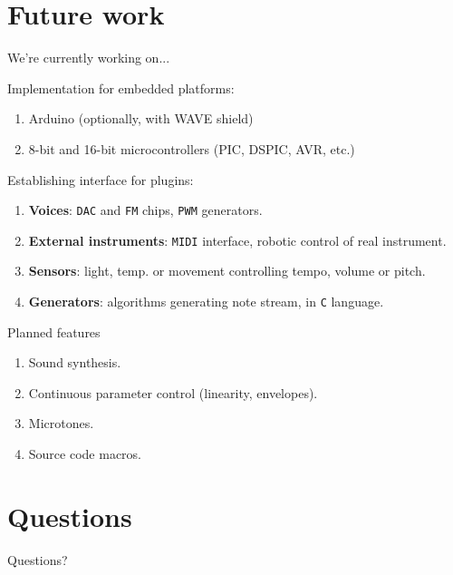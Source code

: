 \documentclass[10pt]{beamer}
\begin{document}
\section{Future work}

\begin{frame}{We're currently working on...}
  \begin{block}{Implementation for embedded platforms:}
    \begin{enumerate}
      \item Arduino (optionally, with WAVE shield)
      \item 8-bit and 16-bit microcontrollers (PIC, DSPIC, AVR, etc.)
    \end{enumerate}
  \end{block}

  \begin{block}{Establishing interface for plugins:}
    \begin{enumerate}
      \item {\bf Voices}: {\tt DAC} and {\tt FM} chips, {\tt PWM} generators.
      \item {\bf External instruments}: {\tt MIDI} interface, robotic control
        of real instrument.
      \item {\bf Sensors}: light, temp. or movement controlling tempo, volume
        or pitch.
      \item {\bf Generators}: algorithms generating note stream, in {\tt C}
        language.
    \end{enumerate}
  \end{block}
\end{frame}

\begin{frame}{Planned features}
  \begin{enumerate}
    \item Sound synthesis.
    \item Continuous parameter control (linearity, envelopes).
    \item Microtones.
    \item Source code macros.
  \end{enumerate}
\end{frame}

\section*{Questions}

\begin{frame}
  \begin{center}
    \Huge{Questions?}
  \end{center}
\end{frame}
\end{document}
